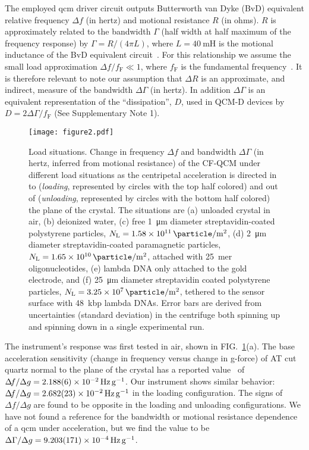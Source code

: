 \documentclass[floatfix,superscriptaddress,a4paper,twocolumn]{revtex4-1}
\newcommand{\Figure}[1]{FIG.~\ref{#1}}
\newcommand{\df}{\Delta\!f}
\newcommand{\dg}{\Delta\Gamma}
\begin{document}
The employed \gls{qcm} driver circuit outputs Butterworth van Dyke (BvD)
equivalent relative frequency $\df$ (in hertz) and motional resistance $R$ (in ohms).
$R$ is approximately related to the bandwidth $\Gamma$ (half width at half
maximum of the frequency response) by $\Gamma=R/\left(4\pi L\right)$, where
$L=\SI{40}{\milli\henry}$ is the motional inductance of the BvD
equivalent circuit~\cite{arnau2002circuit}.  For this
relationship we assume the small load approximation $\df/f_\mathrm{F} \ll
  1$, where $f_\mathrm{F}$ is the fundamental frequency~\cite{geelhood2002transient}.
It is therefore relevant to note our assumption that $\Delta R$ is an
approximate, and indirect, measure of the bandwidth $\dg$ (in
hertz).  In addition $\dg$ is an equivalent representation of the ``dissipation'', $D$, used in
QCM-D devices by $D=2\dg/f_\mathrm{F}$ (See Supplementary Note 1).
\begin{figure*}[ht]
  \centering
  \texttt{[image: figure2.pdf]}
  \caption{Load situations.
    Change in frequency $\df$ and bandwidth $\dg$
    (in hertz, inferred from motional resistance) of
    the CF-QCM under different load situations as the centripetal acceleration
    is directed in to (\textit{loading}, represented by circles with the top half
    colored) and out of (\textit{unloading}, represented by circles with the
    bottom half colored) the plane of the crystal.
    The situations are
    (a) unloaded crystal in air,
    (b) deionized water,
    (c) free \SI{1}{\micro\meter} diameter streptavidin-coated polystyrene
    particles, $N_\mathrm{L}=\SI{1.58e11}{\particle\per\meter\squared}$,
    (d) \SI{2}{\micro\meter} diameter streptavidin-coated paramagnetic
    particles, $N_\mathrm{L}=\SI{1.65e10}{\particle\per\meter\squared}$,
    attached with \SI{25}{mer} oligonucleotides,
    (e) lambda DNA only attached to the gold electrode, and
    (f) \SI{25}{\micro\meter} diameter streptavidin
    coated polystyrene particles,
    $N_\mathrm{L}=\SI{3.25e7}{\particle\per\meter\squared}$, tethered to the sensor surface with
    \SI{48}{kbp} lambda DNAs.  Error bars are derived from uncertainties
    (standard deviation) in
    the centrifuge both spinning up and spinning down in a single experimental
    run.
  }
  \label{fig:loadplot}
\end{figure*}

The instrument's response was first tested in air, shown in
\Figure{fig:loadplot}(a).  The base acceleration sensitivity (change in
frequency versus change in g-force) of AT cut quartz normal to the plane of
the crystal has a reported value~\cite{valdois2794influence} of $\df/\Delta
  g =\SI{2.188+-0.006e-2}{\hertz\per\g}$.  Our instrument shows similar behavior:
$\df/\Delta g =\SI{2.682+-0.023e-2}{\hertz\per\g}$ in the loading
configuration.  The signs of $\df/\Delta g$ are found to be opposite in the loading
and unloading configurations.  We have not found a reference for the
bandwidth or motional resistance dependence of a \gls{qcm} under acceleration,
but we find the value to be $\dg/\Delta g = \SI{9.203+-0.171e-4}{\hertz\per\g}$.
\end{document}
